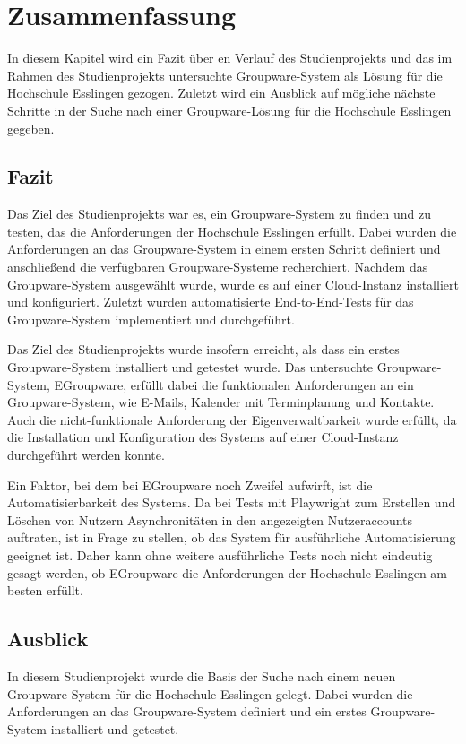 \chapter{Zusammenfassung}

In diesem Kapitel wird ein Fazit über en Verlauf des Studienprojekts und das im Rahmen des Studienprojekts untersuchte Groupware-System als Lösung für die Hochschule Esslingen gezogen.
Zuletzt wird ein Ausblick auf mögliche nächste Schritte in der Suche nach einer Groupware-Lösung für die Hochschule Esslingen gegeben.

\section{Fazit}

Das Ziel des Studienprojekts war es, ein Groupware-System zu finden und zu testen, das die Anforderungen der Hochschule Esslingen erfüllt.
Dabei wurden die Anforderungen an das Groupware-System in einem ersten Schritt definiert und anschließend die verfügbaren Groupware-Systeme recherchiert.
Nachdem das Groupware-System ausgewählt wurde, wurde es auf einer Cloud-Instanz installiert und konfiguriert.
Zuletzt wurden automatisierte End-to-End-Tests für das Groupware-System implementiert und durchgeführt.

Das Ziel des Studienprojekts wurde insofern erreicht, als dass ein erstes Groupware-System installiert und getestet wurde.
Das untersuchte Groupware-System, EGroupware, erfüllt dabei die funktionalen Anforderungen an ein Groupware-System, wie E-Mails, Kalender mit Terminplanung und Kontakte.
Auch die nicht-funktionale Anforderung der Eigenverwaltbarkeit wurde erfüllt, da die Installation und Konfiguration des Systems auf einer Cloud-Instanz durchgeführt werden konnte.

Ein Faktor, bei dem bei EGroupware noch Zweifel aufwirft, ist die Automatisierbarkeit des Systems.
Da bei Tests mit Playwright zum Erstellen und Löschen von Nutzern Asynchronitäten in den angezeigten Nutzeraccounts auftraten, ist in Frage zu stellen, ob das System für ausführliche Automatisierung geeignet ist.
Daher kann ohne weitere ausführliche Tests noch nicht eindeutig gesagt werden, ob EGroupware die Anforderungen der Hochschule Esslingen am besten erfüllt.


\section{Ausblick}

In diesem Studienprojekt wurde die Basis der Suche nach einem neuen Groupware-System für die Hochschule Esslingen gelegt.
Dabei wurden die Anforderungen an das Groupware-System definiert und ein erstes Groupware-System installiert und getestet.

